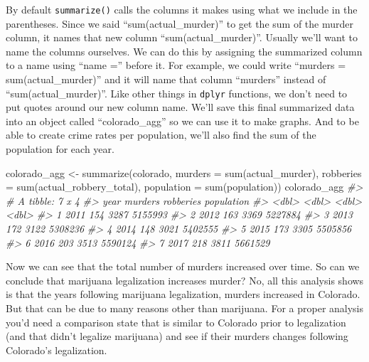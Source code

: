 \documentclass[
]{krantz}
\makeatletter
\newenvironment{Shaded}{\begin{snugshade}}{\end{snugshade}}
\newcommand{\AttributeTok}[1]{\textcolor[rgb]{0.61,0.61,0.61}{#1}}
\newcommand{\CommentTok}[1]{\textcolor[rgb]{0.37,0.37,0.37}{\textit{#1}}}
\newcommand{\FunctionTok}[1]{\textcolor[rgb]{0,0,0}{#1}}
\newcommand{\NormalTok}[1]{#1}
\newcommand{\OtherTok}[1]{\textcolor[rgb]{0.37,0.37,0.37}{#1}}
\newenvironment{kframe}{%
\medskip{}
\setlength{\fboxsep}{.8em}
 \def\at@end@of@kframe{}%
 \ifinner\ifhmode%
  \def\at@end@of@kframe{\end{minipage}}%
  \begin{minipage}{\columnwidth}%
 \fi\fi%
 \def\FrameCommand##1{\hskip\@totalleftmargin \hskip-\fboxsep
 \colorbox{shadecolor}{##1}\hskip-\fboxsep
     \hskip-\linewidth \hskip-\@totalleftmargin \hskip\columnwidth}%
 \MakeFramed {\advance\hsize-\width
   \@totalleftmargin\z@ \linewidth\hsize
   \@setminipage}}%
 {\par\unskip\endMakeFramed%
 \at@end@of@kframe}
\renewenvironment{Shaded}{\begin{kframe}}{\end{kframe}}
\makeatother
\begin{document}
By default \texttt{summarize()} calls the columns it makes using what we include in the parentheses. Since we said ``sum(actual\_murder)'' to get the sum of the murder column, it names that new column ``sum(actual\_murder)''. Usually we'll want to name the columns ourselves. We can do this by assigning the summarized column to a name using ``name ='' before it. For example, we could write ``murders = sum(actual\_murder)'' and it will name that column ``murders'' instead of ``sum(actual\_murder)''. Like other things in \texttt{dplyr} functions, we don't need to put quotes around our new column name. We'll save this final summarized data into an object called ``colorado\_agg'' so we can use it to make graphs. And to be able to create crime rates per population, we'll also find the sum of the population for each year.

\begin{Shaded}
\begin{Highlighting}[]
\NormalTok{colorado\_agg }\OtherTok{\textless{}{-}} \FunctionTok{summarize}\NormalTok{(colorado,}
                          \AttributeTok{murders    =} \FunctionTok{sum}\NormalTok{(actual\_murder),}
                          \AttributeTok{robberies  =} \FunctionTok{sum}\NormalTok{(actual\_robbery\_total),}
                          \AttributeTok{population =} \FunctionTok{sum}\NormalTok{(population))}
\NormalTok{colorado\_agg}
\CommentTok{\#\textgreater{} \# A tibble: 7 x 4}
\CommentTok{\#\textgreater{}    year murders robberies population}
\CommentTok{\#\textgreater{}   \textless{}dbl\textgreater{}   \textless{}dbl\textgreater{}     \textless{}dbl\textgreater{}      \textless{}dbl\textgreater{}}
\CommentTok{\#\textgreater{} 1  2011     154      3287    5155993}
\CommentTok{\#\textgreater{} 2  2012     163      3369    5227884}
\CommentTok{\#\textgreater{} 3  2013     172      3122    5308236}
\CommentTok{\#\textgreater{} 4  2014     148      3021    5402555}
\CommentTok{\#\textgreater{} 5  2015     173      3305    5505856}
\CommentTok{\#\textgreater{} 6  2016     203      3513    5590124}
\CommentTok{\#\textgreater{} 7  2017     218      3811    5661529}
\end{Highlighting}
\end{Shaded}

Now we can see that the total number of murders increased over time. So can we conclude that marijuana legalization increases murder? No, all this analysis shows is that the years following marijuana legalization, murders increased in Colorado. But that can be due to many reasons other than marijuana. For a proper analysis you'd need a comparison state that is similar to Colorado prior to legalization (and that didn't legalize marijuana) and see if their murders changes following Colorado's legalization.
\end{document}
